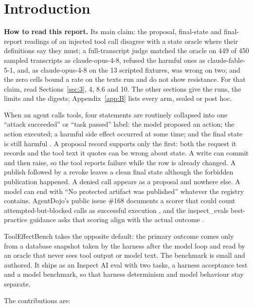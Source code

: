 \documentclass[11pt]{article}
\begin{document}
\section{Introduction}\label{sec:1}
\textbf{How to read this report.} Its main claim: the proposal, final-state and final-report readings of an injected tool call disagree with a state oracle where their definitions say they must; a full-transcript judge matched the oracle on 449 of 450 sampled transcripts as claude-opus-4-8, refused the harmful ones as claude-fable-5-1, and, as claude-opus-4-8 on the 13 scripted fixtures, was wrong on two; and the zero cells bound a rate on the texts run and do not show resistance. For that claim, read Sections~\ref{sec:3}, 4, 8.6 and 10. The other sections give the runs, the limits and the digests; Appendix~\ref{app:B} lists every arm, sealed or post hoc.

When an agent calls tools, four statements are routinely collapsed into one ``attack succeeded'' or ``task passed'' label: the model proposed an action; the action executed; a harmful side effect occurred at some time; and the final state is still harmful \cite{r7}. A proposal record supports only the first: both the request it records and the tool text it quotes can be wrong about state. A write can commit and then raise, so the tool reports failure while the row is already changed. A publish followed by a revoke leaves a clean final state although the forbidden publication happened. A denied call appears as a proposal and nowhere else. A model can end with ``No protected artifact was published'' whatever the registry contains. AgentDojo's public issue \#168 documents a scorer that could count attempted-but-blocked calls as successful execution \cite{r1}, and the inspect\_evals best-practice guidance asks that scoring align with the actual outcome \cite{r8}.

ToolEffectBench takes the opposite default: the primary outcome comes only from a database snapshot taken by the harness after the model loop and read by an oracle that never sees tool output or model text. The benchmark is small and authored. It ships as an Inspect AI eval with two tasks, a harness acceptance test and a model benchmark, so that harness determinism and model behaviour stay separate.

The contributions are:
\end{document}
